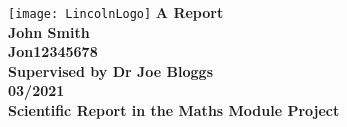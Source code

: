\documentclass[12pt,english]{article}
\begin{document}
\begin{center}
\texttt{[image: LincolnLogo]}
\newline\newline
\thispagestyle{empty}
    \textbf{\huge{A Report } \\[100pt] \Large{John Smith\\Jon12345678} \\[40pt]\LARGE{Supervised by Dr Joe Bloggs}\\[50pt]03/2021\\[80pt]Scientific Report in the Maths Module Project  }
 
\end{center}

\newpage
\end{document}

